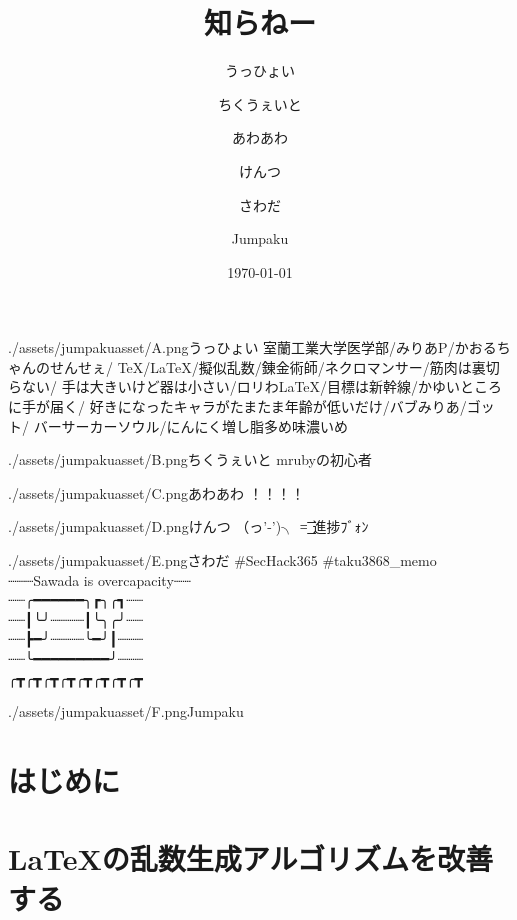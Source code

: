 \documentclass[autodetect-engine,dvipdfmx-if-dvi,ja=standard,a5paper,12pt,twoside,openany,layout=v2,tombow]{bxjsbook}
\title{知らねー}
\author{うっひょい \and ちくうぇいと \and あわあわ \and けんつ \and さわだ \and Jumpaku}
\date{\today}
\newcommand{\articlepath}{./articles}
\newcommand{\assetspath}{./assets}
\newcommand{\coverasset}{\assetspath/coverasset}
\newcommand{\jumpakuasset}{\assetspath/jumpakuasset}
\begin{document}
\begin{titlepage}

\end{titlepage}

\maketitle
\frontmatter
\begin{myintroduce}{\jumpakuasset/A.png}{うっひょい}
  室蘭工業大学医学部/みりあP/かおるちゃんのせんせぇ/
  TeX/LaTeX/擬似乱数/錬金術師/ネクロマンサー/筋肉は裏切らない/
  手は大きいけど器は小さい/ロリわLaTeX/目標は新幹線/かゆいところに手が届く/
  好きになったキャラがたまたま年齢が低いだけ/バブみりあ/ゴット/
  バーサーカーソウル/にんにく増し脂多め味濃いめ
\end{myintroduce}
\begin{myintroduce}{\jumpakuasset/B.png}{ちくうぇいと}
  mrubyの初心者
\end{myintroduce}
\begin{myintroduce}{\jumpakuasset/C.png}{あわあわ}
  ！！！！
\end{myintroduce}
\begin{myintroduce}{\jumpakuasset/D.png}{けんつ}
  （っ'-')╮ =͟͟͞͞ 進捗ﾌﾞｫﾝ
\end{myintroduce}
\begin{myintroduce}{\jumpakuasset/E.png}{さわだ}
  \#SecHack365 \#taku3868\_memo \\┈┈┈Sawada is overcapacity┈┈ \\
   ┈┈╭━━━━━━╮┏╮╭┓┈┈ \\
   ┈┈┃╰╯┈┈┈┈┃╰╮╭╯┈┈ \\
   ┈┈┣━╯┈┈┈┈╰━╯┃┈┈┈ \\
   ┈┈╰━━━━━━━━━╯┈┈┈ \\
   ╭┳╭┳╭┳╭┳╭┳╭┳╭┳╭┳
\end{myintroduce}
\begin{myintroduce}{\jumpakuasset/F.png}{Jumpaku}

\end{myintroduce}

\chapter{はじめに}


\tableofcontents
\mainmatter
{}
\chapter{\LaTeX の乱数生成アルゴリズムを改善する}

\end{document}
